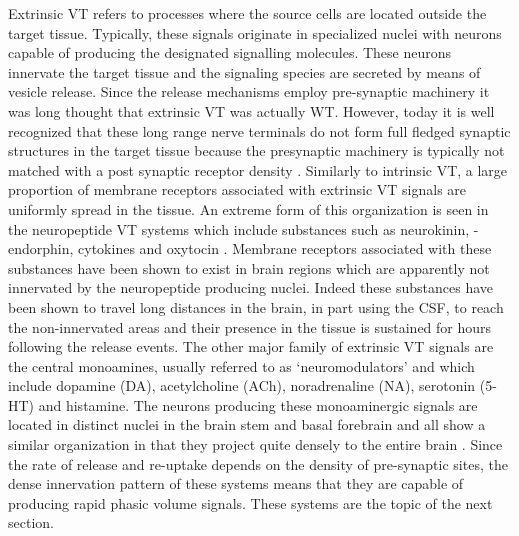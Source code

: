     Extrinsic VT refers to processes where the source cells are located outside the target tissue. Typically, these signals originate in specialized nuclei with neurons capable of producing the designated signalling molecules. These neurons innervate the target tissue and the signaling species are secreted by means of vesicle release. Since the release mechanisms employ pre-synaptic machinery it was long thought that extrinsic VT was actually WT. However, today it is well recognized that these long range nerve terminals do not form full fledged synaptic structures in the target tissue because the presynaptic machinery is typically not matched with a post synaptic receptor density \cite{taber2014volume,rice2008dopamine}. Similarly to intrinsic VT, a large proportion of membrane receptors associated with extrinsic VT signals are uniformly spread in the tissue. An extreme form of this organization is seen in the neuropeptide VT systems which include substances such as neurokinin, \textbeta-endorphin, cytokines and oxytocin \cite{fuxe2010discovery,veening2012volume}. Membrane receptors associated with these substances have been shown to exist in brain regions which are apparently not innervated by the neuropeptide producing nuclei. Indeed these substances have been shown to travel long distances in the brain, in part using the CSF, to reach the non-innervated areas and their presence in the tissue is sustained for hours following the release events. The other major family of extrinsic VT signals are the central monoamines, usually referred to as `neuromodulators' and which include dopamine (DA), acetylcholine (ACh), noradrenaline (NA), serotonin (5-HT) and histamine. The neurons producing these monoaminergic signals are located in distinct nuclei in the brain stem and basal forebrain and all show a similar organization in that they project quite densely to the entire brain \cite{gu2002neuromodulatory}. Since the rate of release and re-uptake depends on the density of pre-synaptic sites, the dense innervation pattern of these systems means that they are capable of producing rapid phasic volume signals. These systems are the topic of the next section.



